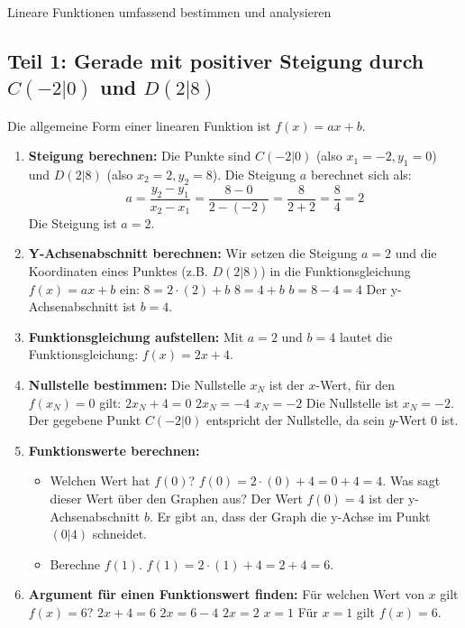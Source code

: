 \begin{loesungsumgebung}{Lineare Funktionen umfassend bestimmen und analysieren}

\subsection*{Teil 1: Gerade mit positiver Steigung durch $C(-2|0)$ und $D(2|8)$}
Die allgemeine Form einer linearen Funktion ist $f(x) = ax+b$.

\begin{enumerate}[label=(\alph*)]
    \item \textbf{Steigung berechnen:}
    Die Punkte sind $C(-2|0)$ (also $x_1=-2, y_1=0$) und $D(2|8)$ (also $x_2=2, y_2=8$).
    Die Steigung $a$ berechnet sich als:
    $$ a = \frac{y_2 - y_1}{x_2 - x_1} = \frac{8 - 0}{2 - (-2)} = \frac{8}{2+2} = \frac{8}{4} = 2 $$
    Die Steigung ist $a=2$.

    \item \textbf{Y-Achsenabschnitt berechnen:}
    Wir setzen die Steigung $a=2$ und die Koordinaten eines Punktes (z.B. $D(2|8)$) in die Funktionsgleichung $f(x) = ax+b$ ein:
    $8 = 2 \cdot (2) + b$
    $8 = 4 + b$
    $b = 8 - 4 = 4$
    Der y-Achsenabschnitt ist $b=4$.

    \item \textbf{Funktionsgleichung aufstellen:}
    Mit $a=2$ und $b=4$ lautet die Funktionsgleichung:
    $f(x) = 2x + 4$.

    \item \textbf{Nullstelle bestimmen:}
    Die Nullstelle $x_N$ ist der $x$-Wert, für den $f(x_N)=0$ gilt:
    $2x_N + 4 = 0$
    $2x_N = -4$
    $x_N = -2$
    Die Nullstelle ist $x_N = -2$.
    Der gegebene Punkt $C(-2|0)$ entspricht der Nullstelle, da sein $y$-Wert 0 ist.

    \item \textbf{Funktionswerte berechnen:}
    \begin{itemize}
        \item Welchen Wert hat $f(0)$?
        $f(0) = 2 \cdot (0) + 4 = 0 + 4 = 4$.
        Was sagt dieser Wert über den Graphen aus? Der Wert $f(0)=4$ ist der y-Achsenabschnitt $b$. Er gibt an, dass der Graph die y-Achse im Punkt $(0|4)$ schneidet.
        \item Berechne $f(1)$.
        $f(1) = 2 \cdot (1) + 4 = 2 + 4 = 6$.
    \end{itemize}

    \item \textbf{Argument für einen Funktionswert finden:} Für welchen Wert von $x$ gilt $f(x) = 6$?
    $2x + 4 = 6$
    $2x = 6 - 4$
    $2x = 2$
    $x = 1$
    Für $x=1$ gilt $f(x)=6$.


\end{enumerate}
\end{loesungsumgebung}
